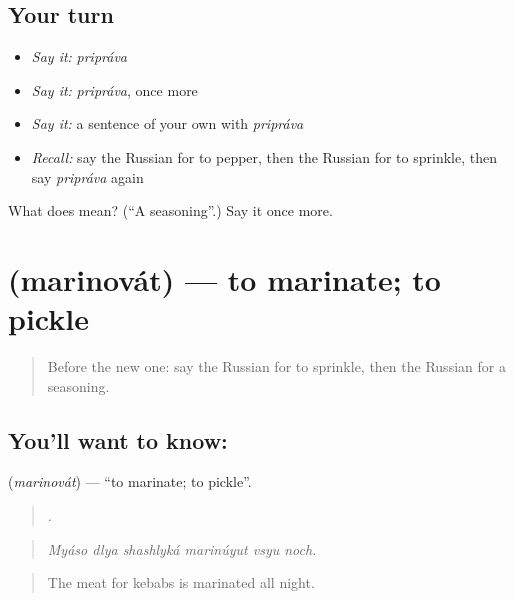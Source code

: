 \subsection*{Your turn}
\begin{itemize}
\raggedright
  \item \emph{Say it:} \emph{pripráva}
  \item \emph{Say it:} \emph{pripráva}, once more
  \item \emph{Say it:} a sentence of your own with \emph{pripráva}
  \item \emph{Recall:} say the Russian for to pepper, then the Russian for to sprinkle, then say \emph{pripráva} again
\end{itemize}

\begin{tcolorbox}[breakable,colback=teal!4,colframe=teal!35!black,title={Before you move on}]
What does  mean? (\textquotedblleft{}A seasoning\textquotedblright{}.) Say it once more.
\end{tcolorbox}
\section[\texorpdfstring{\ru{мариновать} (marinovát)}{мариновать (marinovát)}]{ (marinovát) — to marinate; to pickle}

\label{lesson:RU-C333-marinovat}



\begin{quote}
Before the new one: say the Russian for to sprinkle, then the Russian for a seasoning.
\end{quote}

\subsection*{You'll want to know: }
\textbf{} (\emph{marinovát}) — \textquotedblleft{}to marinate; to pickle\textquotedblright{}.

\begin{quote}
     .
\end{quote}

\begin{quote}
\emph{Myáso dlya shashlyká marinúyut vsyu noch.}
\end{quote}

\begin{quote}
The meat for kebabs is marinated all night.
\end{quote}

